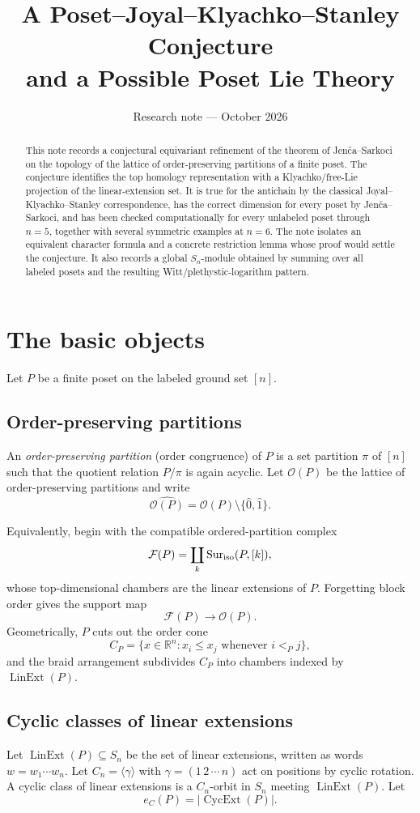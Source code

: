 \documentclass[11pt]{article}
\title{A Poset--Joyal--Klyachko--Stanley Conjecture\\and a Possible Poset Lie Theory}
\author{}
\date{Research note --- October 2026}
\newcommand{\OP}{\mathcal O}
\newcommand{\Lin}{\operatorname{LinExt}}
\newcommand{\Cyc}{\operatorname{CycExt}}
\begin{document}
\maketitle

\begin{abstract}
This note records a conjectural equivariant refinement of the theorem of
Jen\v{c}a--Sarkoci on the topology of the lattice of order-preserving
partitions of a finite poset. The conjecture identifies the top homology
representation with a Klyachko/free-Lie projection of the linear-extension
set. It is true for the antichain by the classical
Joyal--Klyachko--Stanley correspondence, has the correct dimension for every
poset by Jen\v{c}a--Sarkoci, and has been checked computationally for every
unlabeled poset through $n=5$, together with several symmetric examples at
$n=6$. The note isolates an equivalent character formula and a concrete
restriction lemma whose proof would settle the conjecture. It also records
a global $S_n$-module obtained by summing over all labeled posets and the
resulting Witt/plethystic-logarithm pattern.
\end{abstract}

\section{The basic objects}

Let $P$ be a finite poset on the labeled ground set $[n]$.

\subsection{Order-preserving partitions}
An \emph{order-preserving partition} (order congruence) of $P$ is a set
partition $\pi$ of $[n]$ such that the quotient relation $P/\pi$ is again
acyclic. Let $\OP(P)$ be the lattice of order-preserving partitions and
write
\[
\widehat{\OP(P)}=\OP(P)\setminus\{\hat0,\hat1\}.
\]

Equivalently, begin with the compatible ordered-partition complex
\[
\mathcal F(P)=\coprod_k \operatorname{Sur}_{\rm iso}(P,[k]),
\]
whose top-dimensional chambers are the linear extensions of $P$.
Forgetting block order gives the support map
\[
\mathcal F(P)\longrightarrow \OP(P).
\]
Geometrically, $P$ cuts out the order cone
\[
C_P=\{x\in\mathbb R^n:x_i\le x_j \text{ whenever }i<_Pj\},
\]
and the braid arrangement subdivides $C_P$ into chambers indexed by
$\Lin(P)$.

\subsection{Cyclic classes of linear extensions}
Let $\Lin(P)\subseteq S_n$ be the set of linear extensions, written as words
$w=w_1\cdots w_n$. Let $C_n=\langle\gamma\rangle$ with
$\gamma=(1\,2\,\cdots\,n)$ act on positions by cyclic rotation. A cyclic
class of linear extensions is a $C_n$-orbit in $S_n$ meeting $\Lin(P)$.
Let
\[
e_C(P)=|\Cyc(P)|.
\]
\end{document}
